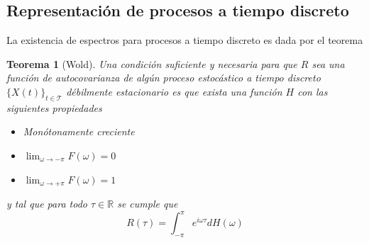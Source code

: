 \documentclass[12pt,letterpaper]{book}
\newtheorem{teorema}{Teorema}[chapter]
\newcommand{\R}{\mathbb{R}}
\newcommand{\intPI}{\int_{-\pi}^{\pi}}
\newcommand{\xt}{$\{X(t)\}_{t\in \mathcal{T}}$ }
\begin{document}

\subsection{Representación de procesos a tiempo discreto}

La existencia de espectros para procesos a tiempo discreto es dada por el teorema

\begin{teorema}[Wold]
Una condición suficiente y necesaria para que $R$ sea una función de autocovarianza de algún proceso estocástico a tiempo discreto \xt débilmente estacionario es que exista una función $H$ con las siguientes propiedades
\begin{itemize}
\item Monótonamente creciente
\item $\lim_{\omega \longrightarrow -\pi} F(\omega) = 0$
\item $\lim_{\omega \longrightarrow +\pi} F(\omega) = 1$
\end{itemize}
y tal que para todo $\tau \in \R$ se cumple que
\begin{equation*}
R(\tau) = \intPI e^{i \omega \tau} dH(\omega)
\end{equation*}
\label{t_wold}
\end{teorema}
\end{document}
